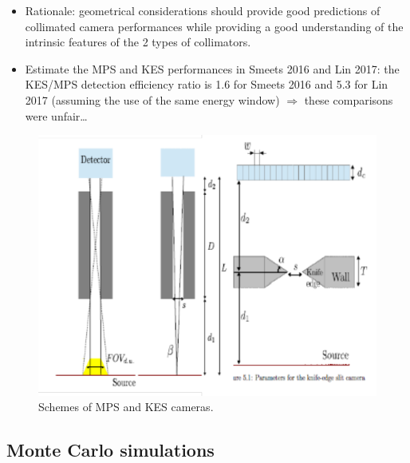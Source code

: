 \documentclass[a4paper,english]{article}
\begin{document}
\begin{itemize}
  \item Rationale: geometrical considerations should provide good predictions of collimated camera performances while providing a good understanding of the intrinsic features of the 2 types of collimators. 
  \item Estimate the MPS and KES performances in Smeets 2016 and Lin 2017: the KES/MPS detection efficiency ratio is 1.6 for Smeets 2016 and 5.3 for Lin 2017 (assuming the use of the same energy window) $\Rightarrow$ these comparisons were unfair\dots    
\end{itemize}

\begin{figure}[htp]
    \centering
    \includegraphics[width=.45\textwidth]{SchemeMPS-KES}
    \caption{\label{GeomSchemes}Schemes of MPS and KES cameras.}
\end{figure}          


\subsection{Monte Carlo simulations}
\end{document}
